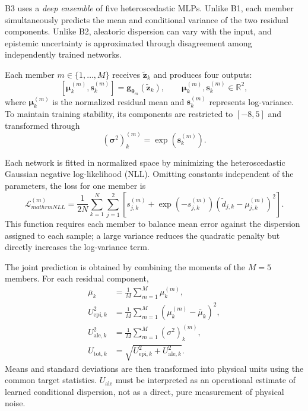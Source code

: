 \documentclass[12pt,a4paper]{report}
\begin{document}
B3 uses a \textit{deep ensemble} of five heteroscedastic MLPs. Unlike B1, each member simultaneously predicts the mean and conditional variance of the two residual components. Unlike B2, aleatoric dispersion can vary with the input, and epistemic uncertainty is approximated through disagreement among independently trained networks.

Each member $m\in\{1,\ldots,M\}$ receives $\tilde{\mathbf{z}}_k$ and produces four outputs:
\begin{equation}
    \left[
        \boldsymbol{\mu}^{(m)}_k,
        \mathbf{s}^{(m)}_k
    \right]
    =
    \mathbf{g}_{\boldsymbol{\theta}_m}
    (\tilde{\mathbf{z}}_k),
    \qquad
    \boldsymbol{\mu}^{(m)}_k,\mathbf{s}^{(m)}_k\in\mathbb{R}^{2},
    \label{eq:b3_member_output}
\end{equation}
where $\boldsymbol{\mu}^{(m)}_k$ is the normalized residual mean and $\mathbf{s}^{(m)}_k$ represents log-variance. To maintain training stability, its components are restricted to $[-8,5]$ and transformed through
\begin{equation}
    \left(\boldsymbol{\sigma}^{2}\right)^{(m)}_k
    =
    \exp\!\left(\mathbf{s}^{(m)}_k\right).
    \label{eq:b3_member_variance}
\end{equation}

Each network is fitted in normalized space by minimizing the heteroscedastic Gaussian negative log-likelihood (NLL). Omitting constants independent of the parameters, the loss for one member is
\begin{equation}
    \mathcal{L}^{(m)}_{mathrm{NLL}}
    =
    \frac{1}{2N}
    \sum_{k=1}^{N}
    \sum_{j=1}^{2}
    \left[
        s^{(m)}_{j,k}
        +
        \exp\!\left(-s^{(m)}_{j,k}\right)
        \left(
            \tilde d_{j,k}-\mu^{(m)}_{j,k}
        \right)^2
    \right].
    \label{eq:b3_heteroscedastic_nll}
\end{equation}
This function requires each member to balance mean error against the dispersion assigned to each sample; a large variance reduces the quadratic penalty but directly increases the log-variance term.

The joint prediction is obtained by combining the moments of the $M=5$ members. For each residual component,
\begin{align}
    \bar{\mu}_k
    &=
    \frac{1}{M}
    \sum_{m=1}^{M}\mu^{(m)}_k,
    \label{eq:b3_ensemble_mean}\\
    U^2_{\mathrm{epi},k}
    &=
    \frac{1}{M}
    \sum_{m=1}^{M}
    \left(\mu^{(m)}_k-\bar{\mu}_k\right)^2,
    \label{eq:b3_epistemic}\\
    U^2_{\mathrm{ale},k}
    &=
    \frac{1}{M}
    \sum_{m=1}^{M}
    \left(\sigma^2\right)^{(m)}_k,
    \label{eq:b3_aleatoric}\\
    U_{\mathrm{tot},k}
    &=
    \sqrt{
        U^2_{\mathrm{epi},k}
        +
        U^2_{\mathrm{ale},k}
    }.
    \label{eq:b3_total_uncertainty}
\end{align}
Means and standard deviations are then transformed into physical units using the common target statistics. $U_{\mathrm{ale}}$ must be interpreted as an operational estimate of learned conditional dispersion, not as a direct, pure measurement of physical noise.
\end{document}
